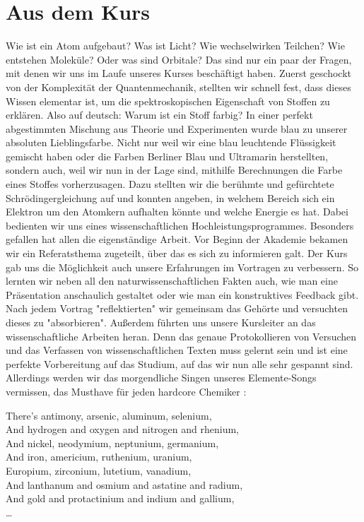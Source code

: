 \section{Aus dem Kurs}
Wie ist ein Atom aufgebaut? Was ist Licht? Wie wechselwirken Teilchen? Wie entstehen Moleküle? Oder was sind Orbitale?
Das sind nur ein paar der Fragen, mit denen wir uns im Laufe unseres Kurses beschäftigt haben. Zuerst geschockt von der Komplexität der Quantenmechanik, stellten wir schnell fest, dass dieses Wissen elementar ist, um die spektroskopischen Eigenschaft von Stoffen zu erklären. Also auf deutsch: Warum ist ein Stoff farbig? In einer perfekt abgestimmten Mischung aus Theorie und Experimenten wurde blau zu unserer absoluten Lieblingsfarbe. Nicht nur weil wir eine blau leuchtende Flüssigkeit gemischt haben oder die Farben Berliner Blau und Ultramarin herstellten, sondern auch, weil wir nun in der Lage sind, mithilfe Berechnungen die Farbe eines Stoffes vorherzusagen. Dazu stellten wir die berühmte und gefürchtete Schrödingergleichung auf und konnten angeben, in welchem Bereich sich ein Elektron um den Atomkern aufhalten könnte und welche Energie es hat. Dabei bedienten wir uns eines wissenschaftlichen Hochleistungsprogrammes. Besonders gefallen hat allen die eigenständige Arbeit. Vor Beginn der Akademie bekamen wir ein Referatsthema zugeteilt, über das es sich zu informieren galt. Der Kurs gab uns die Möglichkeit auch unsere Erfahrungen im Vortragen zu verbessern. So lernten wir neben all den naturwissenschaftlichen Fakten auch, wie man eine Präsentation anschaulich gestaltet oder wie man ein konstruktives Feedback gibt. Nach jedem Vortrag "reflektierten" wir gemeinsam das Gehörte und versuchten dieses zu "absorbieren". Außerdem führten uns unsere Kursleiter an das wissenschaftliche Arbeiten heran. Denn das genaue Protokollieren von Versuchen und das Verfassen von wissenschaftlichen Texten muss gelernt sein und ist eine perfekte Vorbereitung auf das Studium, auf das wir nun alle sehr gespannt sind. Allerdings werden wir das morgendliche Singen unseres Elemente-Songs vermissen, das Musthave für jeden hardcore Chemiker \cite{element_song}:

{\small \noindent
There's antimony, arsenic, aluminum, selenium,      \\
And hydrogen and oxygen and nitrogen and rhenium,   \\
And nickel, neodymium, neptunium, germanium,        \\
And iron, americium, ruthenium, uranium,            \\
Europium, zirconium, lutetium, vanadium,            \\
And lanthanum and osmium and astatine and radium,   \\
And gold and protactinium and indium and gallium,   \\
\dots
}
